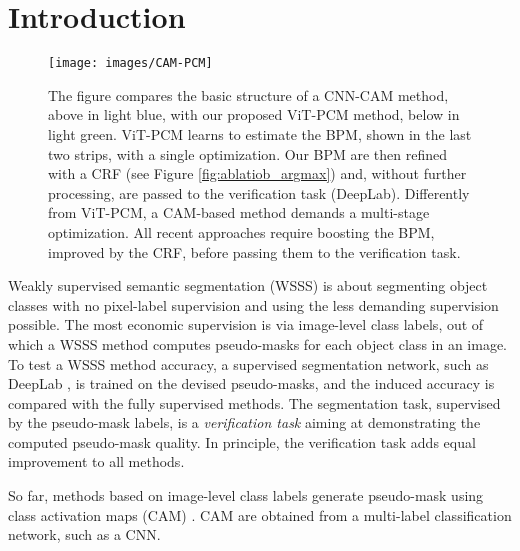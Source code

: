 \documentclass[runningheads]{styles/llncs}
\begin{document}
\section{Introduction}\label{sec:intro}
\begin{figure}[t]
\centering
\texttt{[image: images/CAM-PCM]}
\caption{The figure compares the basic structure of a CNN-CAM method, above in light blue, with our proposed ViT-PCM method, below in light green. ViT-PCM learns to estimate the BPM, shown in the last two strips, with a single optimization.  Our BPM  are then refined with a CRF (see Figure \ref{fig:ablatiob_argmax}) and, without  further processing, are passed to the verification task (DeepLab). Differently from ViT-PCM, a CAM-based method demands a multi-stage optimization. All recent approaches require boosting the BPM, improved by the CRF, before passing them to the verification task.} \label{fig:good-seeds}
\end{figure}
Weakly supervised semantic segmentation (WSSS) is about segmenting object classes with no pixel-label supervision and using the less demanding supervision possible. The most economic supervision is via image-level class labels, out of which a WSSS method computes pseudo-masks for each object class in an image. To test a WSSS method accuracy,  a supervised segmentation network, such as DeepLab \cite{Chen2018DeepLabSI}, is trained on the devised pseudo-masks, and the induced accuracy is compared with the fully supervised methods. The segmentation task, supervised by the pseudo-mask labels, is a {\em verification task} aiming at demonstrating the computed pseudo-mask quality. In principle, the verification task adds equal improvement to all methods.

So far, methods based on image-level class labels generate pseudo-mask using class activation maps (CAM) \cite{zhou2016learning}. CAM are obtained from a multi-label classification network, such as a CNN. 
\end{document}
